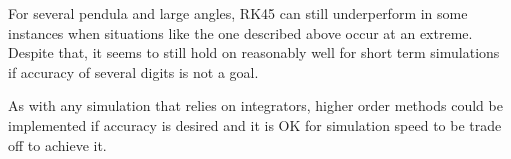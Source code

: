 \documentclass{article}
\begin{document}
For several pendula and large angles, RK45 can still underperform in some instances when situations like the one described above occur at an extreme. Despite that, it seems to still hold on reasonably well for short term simulations if accuracy of several digits is not a goal.

As with any simulation that relies on integrators, higher order methods could be implemented if accuracy is desired and it is OK for simulation speed to be trade off to achieve it.
\end{document}
